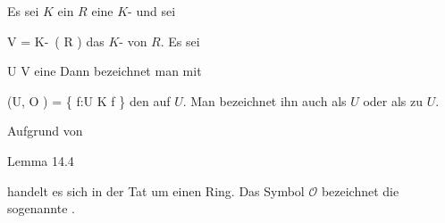 {}
{





Es sei $K$ ein
$R$ eine
$K$-
und sei

\mavergleichskette
{\vergleichskette
{ V
}
{ = }{ K\!-\!\, \left(  R  \right)
}
{  }{
}
{    }{
}
{   }{
}
}
{}{}{}
das
$K$-
von $R$. Es sei

\mavergleichskette
{\vergleichskette
{ U
}
{ \subseteq }{ V
}
{  }{
}
{    }{
}
{   }{
}
}
{}{}{}
eine
Dann bezeichnet man mit

\mavergleichskettedisp
{\vergleichskette
{ \Gamma (U, {\mathcal O} )
}
{ =} { \left\{ f:U \longrightarrow K  \mid  f          \right\}
}
{ } {
}
{ } {
}
{ } {
}
}
{}{}{}
den  auf $U$. Man bezeichnet ihn auch als  $U$ oder als  zu $U$.





}

Aufgrund von

Lemma 14.4

handelt es sich in der Tat um einen Ring. Das Symbol $\mathcal O$
 {} {}
bezeichnet die sogenannte  {.}





